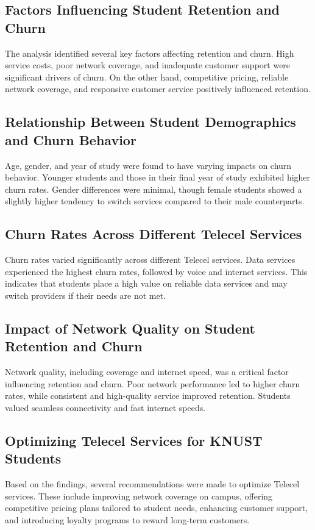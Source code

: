 \documentclass[12pt]{report} %
\begin{document}
\subsection{Factors Influencing Student Retention and Churn}
The analysis identified several key factors affecting retention and churn. High service costs, poor network coverage, and inadequate customer support were significant drivers of churn. On the other hand, competitive pricing, reliable network coverage, and responsive customer service positively influenced retention.

\subsection{Relationship Between Student Demographics and Churn Behavior}
Age, gender, and year of study were found to have varying impacts on churn behavior. Younger students and those in their final year of study exhibited higher churn rates. Gender differences were minimal, though female students showed a slightly higher tendency to switch services compared to their male counterparts.

\subsection{Churn Rates Across Different Telecel Services}
Churn rates varied significantly across different Telecel services. Data services experienced the highest churn rates, followed by voice and internet services. This indicates that students place a high value on reliable data services and may switch providers if their needs are not met.

\subsection{Impact of Network Quality on Student Retention and Churn}
Network quality, including coverage and internet speed, was a critical factor influencing retention and churn. Poor network performance led to higher churn rates, while consistent and high-quality service improved retention. Students valued seamless connectivity and fast internet speeds.

\subsection{Optimizing Telecel Services for KNUST Students}
Based on the findings, several recommendations were made to optimize Telecel services. These include improving network coverage on campus, offering competitive pricing plans tailored to student needs, enhancing customer support, and introducing loyalty programs to reward long-term customers.
\end{document}
